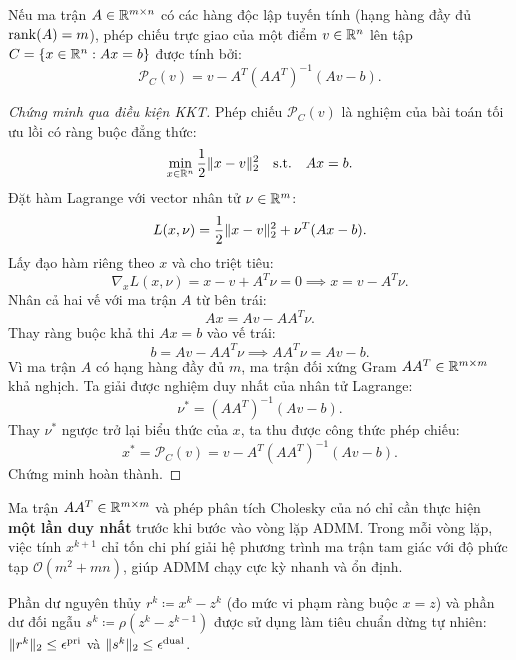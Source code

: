 \begin{theorem}
Nếu ma trận $A \in \mathbb{R}^{m \times n}$ có các hàng độc lập tuyến tính (hạng hàng đầy đủ $\operatorname{rank}(A) = m$), phép chiếu trực giao của một điểm $v \in \mathbb{R}^n$ lên tập $C = \{x \in \mathbb{R}^n : Ax = b\}$ được tính bởi:
\begin{equation}
    \mathcal{P}_C(v) = v - A^T (A A^T)^{-1} (Av - b).
    \label{eq:affine_projection_formula}
\end{equation}
\end{theorem}

\begin{proof}[Chứng minh qua điều kiện KKT]
Phép chiếu $\mathcal{P}_C(v)$ là nghiệm của bài toán tối ưu lồi có ràng buộc đẳng thức:
\[
\min_{x \in \mathbb{R}^n} \frac{1}{2} \|x - v\|_2^2 \quad \text{s.t.} \quad Ax = b.
\]
Đặt hàm Lagrange với vector nhân tử $\nu \in \mathbb{R}^m$:
\[
L(x, \nu) = \frac{1}{2} \|x - v\|_2^2 + \nu^T (Ax - b).
\]
Lấy đạo hàm riêng theo $x$ và cho triệt tiêu:
\[
\nabla_x L(x, \nu) = x - v + A^T \nu = 0 \implies x = v - A^T \nu.
\]
Nhân cả hai vế với ma trận $A$ từ bên trái:
\[
Ax = Av - A A^T \nu.
\]
Thay ràng buộc khả thi $Ax = b$ vào vế trái:
\[
b = Av - A A^T \nu \implies A A^T \nu = Av - b.
\]
Vì ma trận $A$ có hạng hàng đầy đủ $m$, ma trận đối xứng Gram $A A^T \in \mathbb{R}^{m \times m}$ khả nghịch. Ta giải được nghiệm duy nhất của nhân tử Lagrange:
\[
\nu^* = (A A^T)^{-1} (Av - b).
\]
Thay $\nu^*$ ngược trở lại biểu thức của $x$, ta thu được công thức phép chiếu:
\[
x^* = \mathcal{P}_C(v) = v - A^T (A A^T)^{-1} (Av - b).
\]
Chứng minh hoàn thành.
\end{proof}

\begin{remark}
Ma trận $A A^T \in \mathbb{R}^{m \times m}$ và phép phân tích Cholesky của nó chỉ cần thực hiện \textbf{một lần duy nhất} trước khi bước vào vòng lặp ADMM. Trong mỗi vòng lặp, việc tính $x^{k+1}$ chỉ tốn chi phí giải hệ phương trình ma trận tam giác với độ phức tạp $\mathcal{O}(m^2 + mn)$, giúp ADMM chạy cực kỳ nhanh và ổn định.

Phần dư nguyên thủy $r^k \coloneqq x^k - z^k$ (đo mức vi phạm ràng buộc $x = z$) và phần dư đối ngẫu $s^k \coloneqq \rho(z^k - z^{k-1})$ được sử dụng làm tiêu chuẩn dừng tự nhiên: $\|r^k\|_2 \le \epsilon^{\mathrm{pri}}$ và $\|s^k\|_2 \le \epsilon^{\mathrm{dual}}$.
\end{remark}

